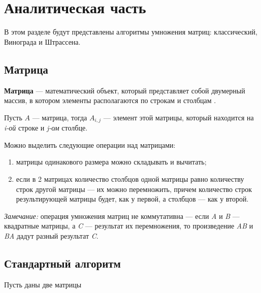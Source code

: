 \chapter{Аналитическая часть}
В этом разделе будут представлены алгоритмы умножения матриц: классический, Винограда и Штрассена.


\section{Матрица}

\textbf{Матрица} --- математический объект, который представляет собой двумерный массив, в котором элементы располагаются по строкам и столбцам \cite{matrix}.

Пусть $A$ --- матрица, тогда $A_{i,j}$ --- элемент этой матрицы, который находится на \textit{i-ой} строке и \textit{j-ом} столбце.

Можно выделить следующие операции над матрицами:
\begin{enumerate}[label=\arabic*)]
    \item матрицы одинакового размера можно складывать и вычитать;
    \item если в 2 матрицах количество столбцов одной матрицы равно количеству строк другой матрицы --- их можно перемножить, причем количество строк результирующей матрицы будет, как у первой, а столбцов --- как у второй. 
\end{enumerate}

\textit{Замечание:} операция умножения матриц не коммутативна --- если \textit{A} и \textit{B} --- квадратные матрицы, а \textit{C} --- результат их перемножения, то произведение \textit{AB} и \textit{BA} дадут разный результат \textit{C}.


\section{Стандартный алгоритм}
Пусть даны две матрицы

